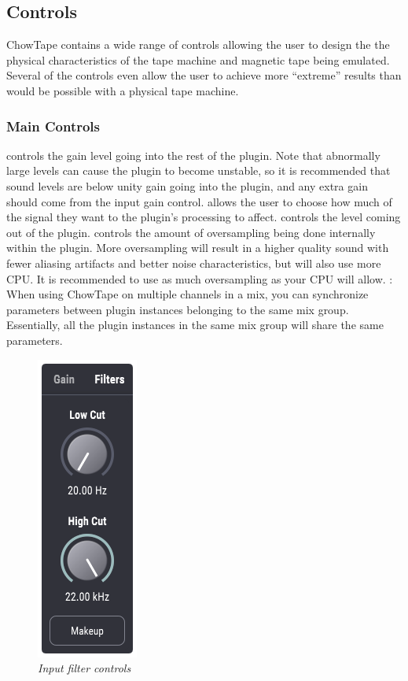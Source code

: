 \documentclass[landscape,twocolumn,a5paper]{manual}
\begin{document}
\subsection{Controls}
ChowTape contains a wide range of controls allowing the
user to design the the physical characteristics of the tape
machine and magnetic tape being emulated. Several of the
controls even allow the user to achieve more ``extreme''
results than would be possible with a physical tape machine.

\subsubsection{Main Controls}
 controls the gain level going into the
rest of the plugin. Note that abnormally large levels can
cause the plugin to become unstable, so it is recommended
that sound levels are below unity gain going into the plugin,
and any extra gain should come from the input gain control. %
\newpar
{} allows the user to choose how much of the
signal they want to the plugin's processing to affect.
\newpar
{} controls the level coming out of the plugin.
\newpar
{} controls the amount of oversampling
being done internally within the plugin. More oversampling
will result in a higher quality sound with fewer aliasing
artifacts and better noise characteristics, but will also
use more CPU. It is recommended to use as much oversampling
as your CPU will allow.
\newpar
{}: When using ChowTape on multiple channels
in a mix, you can synchronize parameters between plugin
instances belonging to the same mix group. Essentially, all
the plugin instances in the same mix group will share the same
parameters.

\begin{figure}[ht]
    \center
    \includegraphics[height=0.32\paperheight]{../Plugin/Screenshots/Filters.png}
    \caption{\label{h_bias}{\it Input filter controls}}
\end{figure}
\end{document}
